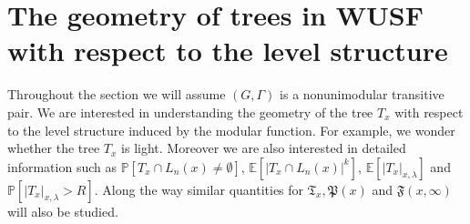 \documentclass[12pt]{article}
\numberwithin{equation}{section}
\newcommand{\1}{\mathbf{1}}
\begin{document}
 
 
 
 
 
 
 
 
 
 
 
 
 
 
 
 
 
 \section{The geometry of trees in WUSF with respect to the level structure}\label{sec: 4}
 
 Throughout the section we will assume $(G,\Gamma)$ is a nonunimodular transitive pair.
 We are interested in understanding the geometry of the tree $T_x$ with respect to the level structure induced by the modular function. For example, we wonder whether the tree $T_x$ is light. Moreover we are also interested in detailed information such as $\mathbb{P}[T_x\cap L_n(x)\neq \emptyset]$, $\mathbb{E}[|T_x\cap L_n(x)|^k]$, $\mathbb{E}[|T_x|_{x,\lambda}]$ and $\mathbb{P}[|T_x|_{x,\lambda }>R]$. Along the way similar quantities for $\mathfrak{T}_x,\mathfrak{P}(x)$ and $\mathfrak{F}(x,\infty)$ will also be studied. 
 
\end{document}
